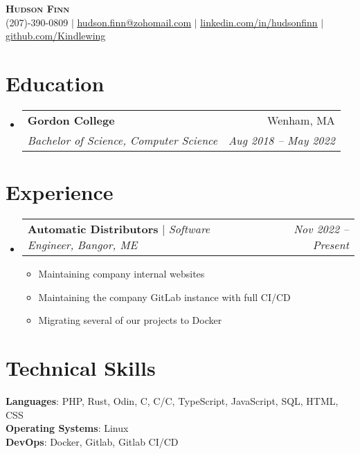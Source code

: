 \documentclass{article}
\makeatletter
\newcommand{\resumeItem}[1]{
  \item\small{
    {#1 \vspace{-2pt}}
  }
}
\newcommand{\resumeSubheading}[4]{
  \vspace{-2pt}\item
    \begin{tabular*}{0.97\textwidth}[t]{l@{\extracolsep{\fill}}r}
      \textbf{#1} & #2 \\
      \textit{#3} & \textit{#4} \\
    \end{tabular*}\vspace{-7pt}
}
\newcommand{\resumeSubSubheading}[2]{
    \item
    \begin{tabular*}{0.97\textwidth}{l@{\extracolsep{\fill}}r}
      \textit{\small#1} & \textit{\small #2} \\
    \end{tabular*}\vspace{-7pt}
}
\newcommand{\resumeJobheading}[4]{
  \vspace{-2pt}\item
    \begin{tabular*}{0.97\textwidth}[t]{l@{\extracolsep{\fill}}r}
      {\textbf{#1} $|$ \textit{#2,} \textit{#3}} & \textit{#4} \\
    \end{tabular*}\vspace{-7pt}
}
\newcommand{\resumeProjectHeading}[3]{
    \item
    \begin{tabular*}{0.97\textwidth}{l@{\extracolsep{\fill}}r}
      {\textbf{#1} $|$ \textit{#2}} & \textit{#3} \\
    \end{tabular*}\vspace{-7pt}
}
\newcommand{\CS}{C\nolinebreak\hspace{-.05em}\raisebox{.6ex}{\scriptsize\bf \#}}
\newcommand{\CC}{C\nolinebreak\hspace{-.05em}\raisebox{.4ex}{\tiny\bf +}\nolinebreak\hspace{-.10em}\raisebox{.4ex}{\tiny\bf +}}
\def\CC{{C\nolinebreak[4]\hspace{-.05em}\raisebox{.4ex}{\tiny\bf ++}}}
\newcommand{\resumeSubHeadingListStart}{\begin{itemize}[leftmargin=0.15in, label={}]}
\newcommand{\resumeSubHeadingListEnd}{\end{itemize}}
\newcommand{\resumeItemListStart}{\begin{itemize}}
\newcommand{\resumeItemListEnd}{\end{itemize}\vspace{-5pt}}
\makeatother
\begin{document}
\begin{center}
    \textbf{\Huge \scshape Hudson Finn} \\ \vspace{1pt}
    (207)-390-0809 $|$ \href{mailto:x@x.com}{\underline{hudson.finn@zohomail.com}} $|$ 
    \href{https://linkedin.com/in/...}{\underline{linkedin.com/in/hudsonfinn}} $|$
    \href{https://github.com/...}{\underline{github.com/Kindlewing}}
\end{center}


\section{Education}
  \resumeSubHeadingListStart
    \resumeSubheading
      {Gordon College}{Wenham, MA}
      {Bachelor of Science, Computer Science}{Aug 2018 -- May 2022}
    \resumeSubHeadingListEnd


\section{Experience}
  \resumeSubHeadingListStart
    \resumeJobheading
      {Automatic Distributors}{Software Engineer}{Bangor, ME}{Nov 2022 -- Present}
      \resumeItemListStart
        \resumeItem{Maintaining company internal websites}
		\resumeItem{Maintaining the company GitLab instance with full CI/CD}
		\resumeItem{Migrating several of our projects to Docker}
      \resumeItemListEnd
  \resumeSubHeadingListEnd
  



\section{Technical Skills}
 \begin{itemize}[leftmargin=0.15in, label={}]
    \small{\item{
     \textbf{Languages}{: PHP, Rust, Odin, \CS, C/\CC, TypeScript, JavaScript, SQL, HTML, CSS} \\
     \textbf{Operating Systems}{: Linux} \\
     \textbf{DevOps}{: Docker, Gitlab, Gitlab CI/CD}
    }}
 \end{itemize}

\end{document}
